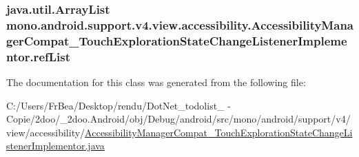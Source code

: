 \hypertarget{classmono_1_1android_1_1support_1_1v4_1_1view_1_1accessibility_1_1_accessibility_manager_compat_9bd6a396809ffec70e161c1567d2a373_8361ba4e6736d75136a6ce56e524d944}{
\subsubsection[{refList}]{\setlength{\rightskip}{0pt plus 5cm}java.util.ArrayList {\bf mono.android.support.v4.view.accessibility.AccessibilityManagerCompat\_\-TouchExplorationStateChangeListenerImplementor.refList}}}
\label{classmono_1_1android_1_1support_1_1v4_1_1view_1_1accessibility_1_1_accessibility_manager_compat_9bd6a396809ffec70e161c1567d2a373_8361ba4e6736d75136a6ce56e524d944}




The documentation for this class was generated from the following file:\begin{CompactItemize}
\item 
C:/Users/FrBea/Desktop/rendu/DotNet\_\-todolist\_ - Copie/2doo/\_\-2doo.Android/obj/Debug/android/src/mono/android/support/v4/view/accessibility/\hyperlink{_accessibility_manager_compat___touch_exploration_state_change_listener_implementor_8java}{AccessibilityManagerCompat\_\-TouchExplorationStateChangeListenerImplementor.java}\end{CompactItemize}
